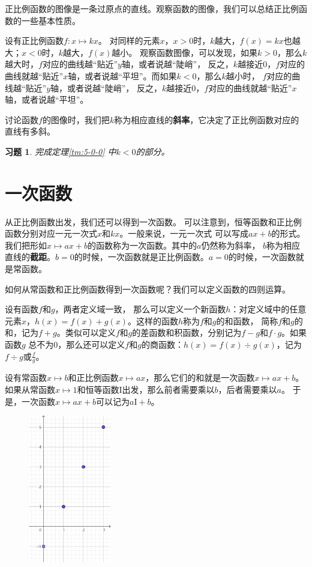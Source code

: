 \documentclass[12pt,UTF8]{ctexbook}
\newtheorem{xt}{习题}[section]
\begin{document}
正比例函数的图像是一条过原点的直线。观察函数的图像，我们可以总结正比例函数的一些基本性质。

设有正比例函数$f: x\mapsto kx$。
对同样的元素$x$，$x>0$时，$k$越大，$f(x) = kx$也越大；$x<0$时，$k$越大，$f(x)$越小。
观察函数图像，可以发现，如果$k>0$，那么$k$越大时，$f$对应的曲线越“贴近”$y$轴，或者说越“陡峭”，
反之，$k$越接近$0$，$f$对应的曲线就越“贴近”$x$轴，或者说越“平坦”。而如果$k<0$，那么$k$越小时，
$f$对应的曲线越“贴近”$y$轴，或者说越“陡峭”，
反之，$k$越接近$0$，$f$对应的曲线就越“贴近”$x$轴，或者说越“平坦”。

讨论函数$f$的图像时，我们把$k$称为相应直线的\textbf{斜率}，它决定了正比例函数对应的直线有多斜。

\begin{xt}\label{xt:5-0-0}
    完成定理\ref{tm:5-0-0} 中$k<0$的部分。
\end{xt}

\section{一次函数}
从正比例函数出发，我们还可以得到一次函数。
可以注意到，恒等函数和正比例函数分别对应一元一次式$x$和$kx$。一般来说，一元一次式
可以写成$ax+b$的形式。我们把形如$x \mapsto ax + b$的函数称为一次函数。其中的$a$仍然称为斜率，
$b$称为相应直线的\textbf{截距}。$b=0$的时候，一次函数就是正比例函数。$a=0$的时候，一次函数就是常函数。

如何从常函数和正比例函数得到一次函数呢？我们可以定义函数的四则运算。

设有函数$f$和$g$，两者定义域一致，
那么可以定义一个新函数$h$：对定义域中的任意元素$x$，$h(x) = f(x) + g(x)$。这样的函数$h$称为$f$和$g$的和函数，
简称$f$和$g$的和，记为$f + g$。类似可以定义$f$和$g$的差函数和积函数，分别记为$f - g$和$f\cdot g$。如果函数$g$
总不为$0$，那么还可以定义$f$和$g$的商函数：$h(x) = f(x) \div g(x)$，记为$f \div g$或$\frac{f}{g}$。

设有常函数$x\mapsto b$和正比例函数$x\mapsto ax$，那么它们的和就是一次函数$x\mapsto ax + b$。
如果从常函数$x\mapsto 1$和恒等函数$\mathrm{I}$出发，那么前者需要乘以$b$，后者需要乘以$a$。
于是，一次函数$x \mapsto ax + b$可以记为$a\mathrm{I} +b$。

\begin{figure} %
    \vspace{-10pt}
    \flushright
    \includegraphics[width=0.32\textwidth]{一次函数1.png}
\end{figure}
\end{document}
